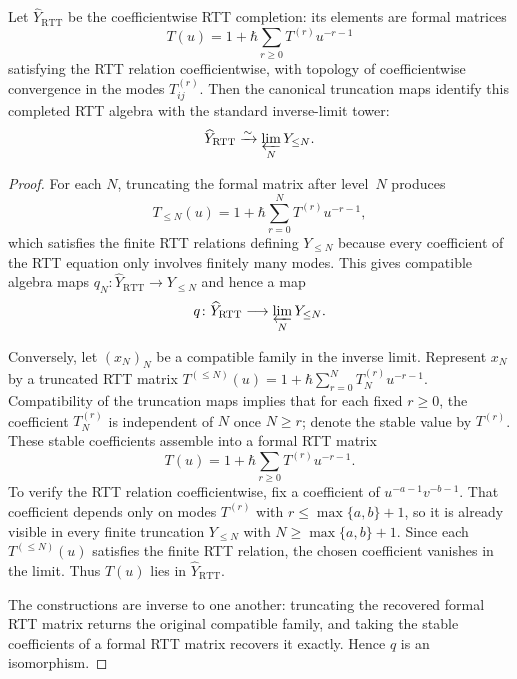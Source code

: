 \begin{proposition}
\label{prop:yangian-rtt-completion-identification}
Let $\widehat Y_{\mathrm{RTT}}$ be the coefficientwise RTT completion:
its elements are formal matrices
\[
T(u)=1+\hbar\sum_{r \ge 0} T^{(r)}u^{-r-1}
\]
satisfying the RTT relation coefficientwise, with topology of
coefficientwise convergence in the modes $T_{ij}^{(r)}$.  Then the
canonical truncation maps identify this completed RTT algebra with the
standard inverse-limit tower:
\[
\widehat Y_{\mathrm{RTT}} \xrightarrow{\sim} \varprojlim_N Y_{\le N}.
\]
\end{proposition}

\begin{proof}
For each $N$, truncating the formal matrix after level~$N$ produces
\[
T_{\le N}(u)=1+\hbar\sum_{r=0}^N T^{(r)}u^{-r-1},
\]
which satisfies the finite RTT relations defining $Y_{\le N}$ because
every coefficient of the RTT equation only involves finitely many modes.
This gives compatible algebra maps
$q_N\colon \widehat Y_{\mathrm{RTT}} \to Y_{\le N}$ and hence a map
\[
q\colon \widehat Y_{\mathrm{RTT}} \longrightarrow \varprojlim_N Y_{\le N}.
\]

Conversely, let $(x_N)_N$ be a compatible family in the inverse limit.
Represent $x_N$ by a truncated RTT matrix
$T^{(\le N)}(u)=1+\hbar\sum_{r=0}^N T_N^{(r)}u^{-r-1}$.
Compatibility of the truncation maps implies that for each fixed
$r \ge 0$, the coefficient $T_N^{(r)}$ is independent of $N$ once
$N \ge r$; denote the stable value by $T^{(r)}$.  These stable
coefficients assemble into a formal RTT matrix
\[
T(u)=1+\hbar\sum_{r \ge 0} T^{(r)}u^{-r-1}.
\]
To verify the RTT relation coefficientwise, fix a coefficient of
$u^{-a-1}v^{-b-1}$.  That coefficient depends only on modes
$T^{(r)}$ with $r \le \max\{a,b\}+1$, so it is already visible in every
finite truncation $Y_{\le N}$ with $N \ge \max\{a,b\}+1$.  Since each
$T^{(\le N)}(u)$ satisfies the finite RTT relation, the chosen
coefficient vanishes in the limit.  Thus $T(u)$ lies in
$\widehat Y_{\mathrm{RTT}}$.

The constructions are inverse to one another: truncating the recovered
formal RTT matrix returns the original compatible family, and taking the
stable coefficients of a formal RTT matrix recovers it exactly.  Hence
$q$ is an isomorphism.
\end{proof}

